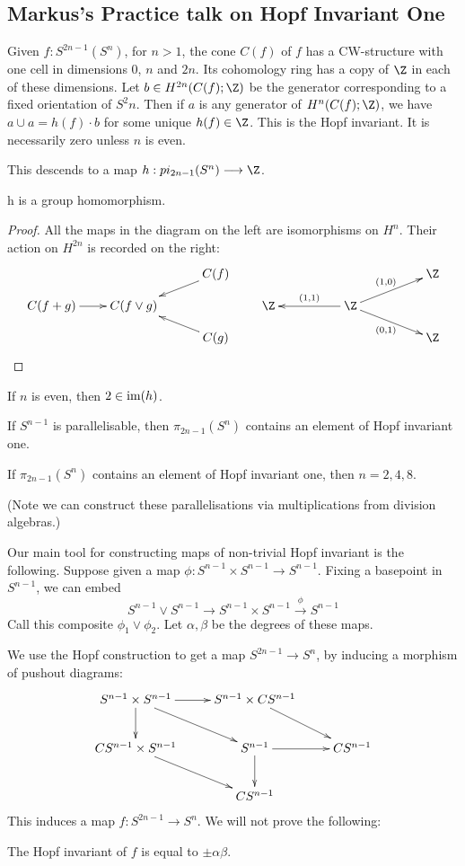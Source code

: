 \documentclass[11pt]{article}
\newcommand{\KanSemResponse}[1]
{
\thispagestyle{fancy}
\subsection*{#1}
}
\begin{document}
\begin{MarkusHopfInvOnePractice}
\KanSemResponse
{Markus's Practice talk on Hopf Invariant One}
Given $f:S^{2n-1}(S^n)$, for $n>1$, the cone $C(f)$ of $f$ has a CW-structure with one cell in dimensions 0, $n$ and $2n$. Its cohomology ring has a copy of $\Z$ in each of these dimensions. Let $b\in H^{2n}(C(f);\Z)$ be the generator corresponding to a fixed orientation of $S^2n$. Then if $a$ is any generator of $H^{n}(C(f);\Z)$, we have $a\cup a=h(f)\cdot b$ for some unique $h(f)\in\Z$. This is the Hopf invariant. It is necessarily zero unless $n$ is even.

This descends to a map $h:pi_{2n-1}(S^n)\to\Z$.
\begin{lem*}
h is a group homomorphism.
\end{lem*}
\begin{proof} All the maps in the diagram on the left are isomorphisms on $H^n$. Their action on $H^{2n}$ is recorded on the right:
\[\xymatrix@!0@R=.9cm@C=2.3cm{
&&C(f)\ar[ld]\\
C(f+g)\ar[r]&C(f\vee g)\\
&&C(g)\ar[lu]
}\qquad\xymatrix@!0@R=.9cm@C=2.3cm{
&&\Z\ar[ld];[]^{(1,0)}\\
\Z\ar[r];[]_{(1,1)}&\Z\\
&&\Z\ar[lu];[]_{(0,1)}
}\]
\end{proof}
\begin{prop*}
If $n$ is even, then $2\in\operatorname{im}(h)$.
\end{prop*}
\begin{prop*}
If $S^{n-1}$ is parallelisable, then $\pi_{2n-1}(S^n)$ contains an element of Hopf invariant one.
\end{prop*}
\begin{thm*}
If $\pi_{2n-1}(S^n)$ contains an element of Hopf invariant one, then $n=2,4,8$.
\end{thm*}
\noindent (Note we can construct these parallelisations via multiplications from division algebras.)

Our main tool for constructing maps of non-trivial Hopf invariant is the following. Suppose given a map $\phi:S^{n-1}\times S^{n-1}\to S^{n-1}$. Fixing a basepoint in $S^{n-1}$, we can embed
\[S^{n-1}\vee S^{n-1}\to S^{n-1}\times S^{n-1}\overset{\phi}{\to} S^{n-1}\]
Call this composite $\phi_1\vee\phi_2$. Let $\alpha,\beta$ be the degrees of these maps.

We use the Hopf construction to get a map $S^{2n-1}\to S^n$, by inducing a morphism of pushout diagrams:
\[\xymatrix{%
S^{n-1}\times S^{n-1}\ar[r]\ar[d]\ar[rd]&S^{n-1}\times CS^{n-1}\ar[rd]\\
CS^{n-1}\times S^{n-1}\ar[rd]&S^{n-1}\ar[r]\ar[d]&CS^{n-1}\\
&CS^{n-1}
}\]
This induces a map $f:S^{2n-1}\to S^n$. We will not prove the following:
\begin{prop*}
The Hopf invariant of $f$ is equal to $\pm\alpha\beta$.
\end{prop*}


\end{MarkusHopfInvOnePractice}
\end{document}
